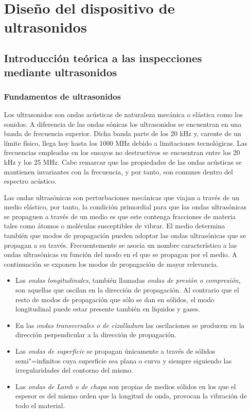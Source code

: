 \chapter{Diseño del dispositivo de ultrasonidos}


\section{Introducción teórica a las inspecciones mediante ultrasonidos}\label{sec:theory}


\subsection{Fundamentos de ultrasonidos}

Los ultrasonidos son ondas acústicas de naturaleza mecánica o elástica como los sonidos. A diferencia de las ondas sónicas los ultrasonidos se encuentran en una banda de frecuencia superior. Dicha banda parte de los 20 kHz y, carente de un límite físico, llega hoy hasta los 1000 MHz debido a limitaciones tecnológicas. Las frecuencias empleadas en los ensayos no destructivos se encuentran entre los 20 kHz y los 25 MHz. Cabe remarcar que las propiedades de las ondas acústicas se mantienen invariantes con la frecuencia, y por tanto, son comunes dentro del espectro acústico.\par
Las ondas ultrasónicas son perturbaciones mecánicas que viajan a través de un medio elástico, por tanto, la condición primordial para que las ondas ultrasónicas se propaguen a través de un medio es que este contenga fracciones de materia tales como átomos o moléculas susceptibles de vibrar. El medio determina también que modos de propagación pueden adoptar las ondas ultrasónicas que se propagan a su través. Frecuentemente se asocia un nombre característico a las ondas ultrasónicas en función del modo en el que se propagan por el medio. A continuación se exponen los modos de propagación de mayor relevancia.

\begin{itemize}
	\item Las \emph{ondas longitudinales}, también llamadas \emph{ondas de presión o compresión}, son aquellas que oscilan en la dirección de propagación. Al contrario que el resto de modos de propagación que sólo se dan en sólidos, el modo longitudinal puede estar presente también en líquidos y gases.
	\item En las \emph{ondas transversales o de cizalladura} las oscilaciones se producen en la dirección perpendicular a la dirección de propagación.
	\item Las \emph{ondas de superficie} se propagan únicamente a través de sólidos semi"=infinitos cuya superficie sea plana o curva y siempre siguiendo las irregularidades del contorno del mismo.
	\item Las \emph{ondas de Lamb o de chapa} son propias de medios sólidos en los que el espesor es del mismo orden que la longitud de onda, provocan la vibración de todo el material.
\end{itemize}

